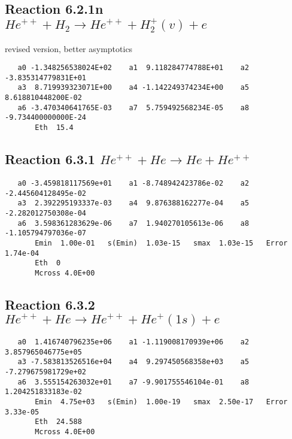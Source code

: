 \documentclass[12pt,dvipdfm]{article}
\begin{document}
\subsection{
Reaction 6.2.1n $   He^{++} + H_2 \rightarrow He^{++} + H_2^+(v) + e$}
revised version, better asymptotics

\begin{small}\begin{verbatim}
   a0 -1.348256538024E+02    a1  9.118284774788E+01    a2 -3.835314779831E+01
   a3  8.719939323071E+00    a4 -1.142249374234E+00    a5  8.618810448200E-02
   a6 -3.470340641765E-03    a7  5.759492568234E-05    a8 -9.734400000000E-24
       Eth  15.4
\end{verbatim}\end{small}


\newpage
\subsection{
Reaction 6.3.1 $   He^{++} + He \rightarrow He + He^{++}$}


\begin{small}\begin{verbatim}
   a0 -3.459818117569e+01    a1 -8.748942423786e-02    a2 -2.445604128495e-02
   a3  2.392295193337e-03    a4  9.876388162277e-04    a5 -2.282012750308e-04
   a6  3.598361283629e-06    a7  1.940270105613e-06    a8 -1.105794797036e-07
       Emin  1.00e-01   s(Emin)  1.03e-15   smax  1.03e-15   Error  1.74e-04
       Eth  0
       Mcross 4.0E+00
\end{verbatim}\end{small}

\newpage
\subsection{
Reaction 6.3.2 $   He^{++} + He \rightarrow He^{++} + He^+(1s) + e$}


\begin{small}\begin{verbatim}
   a0  1.416740796235e+06    a1 -1.119008170939e+06    a2  3.857965046775e+05
   a3 -7.583813526516e+04    a4  9.297450568358e+03    a5 -7.279675981729e+02
   a6  3.555154263032e+01    a7 -9.901755546104e-01    a8  1.204251833183e-02
       Emin  4.75e+03   s(Emin)  1.00e-19   smax  2.50e-17   Error 3.33e-05
       Eth  24.588
       Mcross 4.0E+00
\end{verbatim}\end{small}
\end{document}
